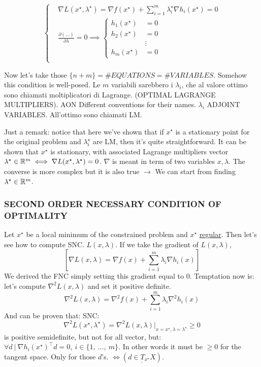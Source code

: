 \[
	\left\{
	\begin{aligned}
	&\nabla{L(x^\star,\lambda^\star)} = \nabla{f(x^\star)} + \sum_{i=1}^m{\lambda_i^\star\nabla{h_i(x^\star)}} = 0 \\
	&\frac{\partial{(\dots)}}{\partial{\lambda}} = 0 \implies
		\left\{
		\begin{aligned}
		h_1(x^\star) &= 0\\
		h_2(x^\star) &= 0\\
					 &\vdots\\
		h_m(x^\star) &= 0
		\end{aligned} 
		\right. \\
	\end{aligned} 
	\right.
\]

Now let's take those $\{n+m\} = \#EQUATIONS = \#VARIABLES$. Somehow this condition is well-posed.
Le $m$ variabili sarebbero i $\lambda_i$, che al valore ottimo sono chiamati moltiplicatori di Lagrange. (OPTIMAL LAGRANGE MULTIPLIERS). AON Different conventions for their names. $\lambda_i$ ADJOINT VARIABLES. All'ottimo sono chiamati LM.

Just a remark: notice that here we've shown that if $x^\star$ is a stationary point for the original problem and $\lambda_i^\star$ are LM, then it's quite straightforward. It can be shown that $x^\star$ is stationary, with associated Lagrange multipliers vector $\lambda^\star\in\mathbb{R}^m \iff \nabla{L(x^\star,\lambda^\star)} = 0$. $\nabla$ is meant in term of two variables $x,\lambda$. The converse is more complex but it is also true $\rightarrow$ We can start from finding $\lambda^\star\in\mathbb{R}^m$.

\subsubsection{SECOND ORDER NECESSARY CONDITION OF OPTIMALITY}

Let $x^\star$ be a local minimum of the constrained problem and $x^\star$ \underline{regular}. Then let's see how to compute SNC. $L(x,\lambda)$. If we take the gradient of $L(x,\lambda)$,
\[
	[\nabla{L(x,\lambda)} = \nabla{f(x)} + \sum_{i=1}^m{\lambda_i\nabla{h_i(x)}}]
\]
We derived the FNC simply setting this gradient equal to 0. Temptation now is: let's compute $\nabla^2L(x,\lambda)$ and set it positive definite.
\[
	\nabla^2{L(x,\lambda)} = \nabla^2{f(x)} + \sum_{i=1}^m{\lambda_i\nabla^2{h_i(x)}}
\]
And can be proven that:
SNC:
\[
	\nabla^2{L(x^\star,\lambda^\star)} = \nabla^2{L(x,\lambda)}|_{x=x^\star,\lambda=\lambda^\star} \geq 0
\]
is positive semidefinite, but not for all vector, but: $\forall d\ |\ \nabla{h_i(x^\star)}^\top d = 0,\ i\in\{1,\ \dots,\ m\}$. In other words it must be $\geq 0$ for the tangent space. Only for those $d$'s. $\iff (\underline{d\in T_{x^\star}X})$.

